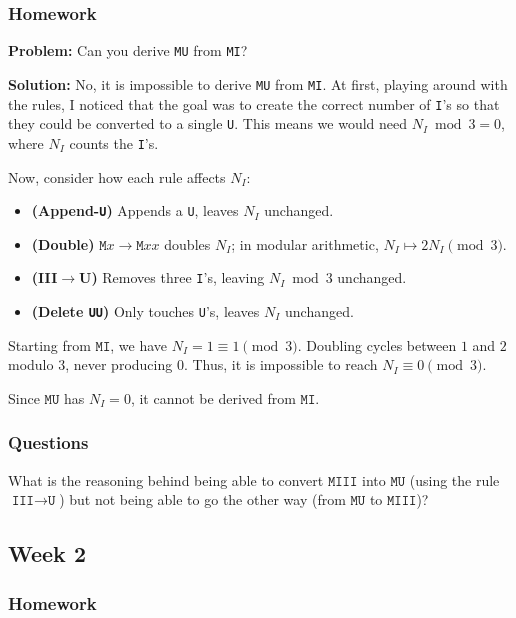\documentclass{article}
\theoremstyle{theorem}
\theoremstyle{definition}
\theoremstyle{remark}
\begin{document}
\subsubsection{Homework}

\textbf{Problem:} Can you derive \texttt{MU} from \texttt{MI}?

\textbf{Solution:} No, it is impossible to derive \texttt{MU} from \texttt{MI}. At first, 
playing around with the rules, I noticed that the goal was to create the correct number 
of \texttt{I}'s so that they could be converted to a single \texttt{U}. This means we 
would need $N_I \bmod 3 = 0$, where $N_I$ counts the \texttt{I}'s.

Now, consider how each rule affects $N_I$:
\begin{itemize}
  \item \textbf{(Append-\texttt{U})} Appends a \texttt{U}, leaves $N_I$ unchanged.
  \item \textbf{(Double)} $\texttt{M}x \to \texttt{M}xx$ doubles $N_I$; in modular arithmetic, $N_I \mapsto 2N_I \pmod{3}$.
  \item \textbf{(III$\to$U)} Removes three \texttt{I}'s, leaving $N_I \bmod 3$ unchanged.
  \item \textbf{(Delete \texttt{UU})} Only touches \texttt{U}'s, leaves $N_I$ unchanged.
\end{itemize}

Starting from $\texttt{MI}$, we have $N_I = 1 \equiv 1 \pmod{3}$. Doubling cycles 
between $1$ and $2$ modulo $3$, never producing $0$. Thus, it is impossible to reach 
$N_I \equiv 0 \pmod{3}$.

Since $\texttt{MU}$ has $N_I=0$, it cannot be derived from $\texttt{MI}$.

\subsubsection{Questions}

What is the reasoning behind being able to convert $\texttt{MIII}$ into $\texttt{MU}$ 
(using the rule $\texttt{III}\to \texttt{U}$) but not being able to go the other way 
(from $\texttt{MU}$ to $\texttt{MIII}$)?

\subsection{Week 2}

\subsubsection{Homework}
\end{document}
